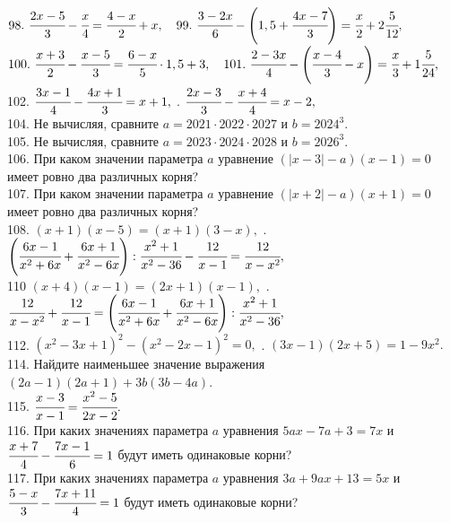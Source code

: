 \documentclass[12pt]{article}
\begin{document}
$98.\ \cfrac{2x-5}{3}-\cfrac{x}{4}=\cfrac{4-x}{2}+x, \quad 99.\ \cfrac{3-2x}{6}-\left(1,5+\cfrac{4x-7}{3}\right)=\cfrac{x}{2}+2\cfrac{5}{12},$\\
$100.\ \cfrac{x+3}{2}-\cfrac{x-5}{3}=\cfrac{6-x}{5}\cdot1,5+3, \quad 101.\ \cfrac{2-3x}{4}-\left(\cfrac{x-4}{3}-x\right)=\cfrac{x}{3}+1\cfrac{5}{24},$\\
102. $\cfrac{3x-1}{4}-\cfrac{4x+1}{3}=x+1,$ . $\cfrac{2x-3}{3}-\cfrac{x+4}{4}=x-2,$\\
104. Не вычисляя, сравните $a=2021\cdot2022\cdot2027$ и $b=2024^3.$\\
105. Не вычисляя, сравните $a=2023\cdot2024\cdot2028$ и $b=2026^3.$\\
106. При каком значении параметра $a$ уравнение $(|x-3|-a)(x-1)=0$ имеет ровно два различных корня?\\
107. При каком значении параметра $a$ уравнение $(|x+2|-a)(x+1)=0$ имеет ровно два различных корня?\\
108. $(x+1)(x-5)=(x+1)(3-x),$ . $\left(\cfrac{6x-1}{x^2+6x}+\cfrac{6x+1}{x^2-6x}\right):\cfrac{x^2+1}{x^2-36}-\cfrac{12}{x-1}=\cfrac{12}{x-x^2},$\\
110 $(x+4)(x-1)=(2x+1)(x-1),$ . $\cfrac{12}{x-x^2}+\cfrac{12}{x-1}=\left(\cfrac{6x-1}{x^2+6x}+\cfrac{6x+1}{x^2-6x}\right):\cfrac{x^2+1}{x^2-36},$\\
112. $(x^2-3x+1)^2-(x^2-2x-1)^2=0,$ . $(3x-1)(2x+5)=1-9x^2.$\\
114. Найдите наименьшее значение выражения $(2a-1)(2a+1)+3b(3b-4a).$\\
115. $\cfrac{x-3}{x-1}=\cfrac{x^2-5}{2x-2}.$\\
116. При каких значениях параметра $a$ уравнения $5ax - 7a + 3 = 7x$ и $\cfrac{x+7}{4}-\cfrac{7x-1}{6}=1$ будут иметь одинаковые корни?\\
117. При каких значениях параметра $a$ уравнения $3a + 9ax + 13 = 5x$ и $\cfrac{5-x}{3}-\cfrac{7x+11}{4}=1$ будут иметь одинаковые корни?
\newpage
\end{document}
